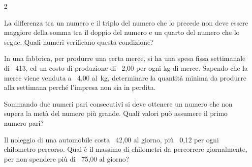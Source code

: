 \begin{htmulticols}{2}

% 
% 

\begin{esercizio}[]
\label{ese:dis_}
La differenza tra un numero e il triplo del numero che lo precede non deve 
essere maggiore della somma tra il doppio del numero e un quarto del numero 
che lo segue. Quali numeri verificano questa condizione?
\end{esercizio}

\begin{esercizio}
\label{ese:dis_}
In una fabbrica, per produrre una certa merce, si ha
una spesa fissa settimanale di \officialeuro\ 413, ed un costo di 
produzione di \officialeuro\ 2,00 per ogni
kg di merce. 
Sapendo che la merce viene venduta a \officialeuro\ 4,00 al~kg, 
determinare la quantità minima da produrre
alla settimana perché l'impresa non sia in perdita.
\end{esercizio}

\begin{esercizio}[]
\label{ese:dis_}
Sommando due numeri pari consecutivi si deve ottenere un numero che
non supera la metà del numero più grande. Quali valori può
assumere il primo numero pari?
\end{esercizio}

\begin{esercizio}[]
\label{ese:dis_}
Il noleggio di una automobile costa \officialeuro\ 42,00 al giorno, più
\officialeuro\ 0,12 per ogni chilometro percorso. Qual è il massimo di
chilometri da percorrere giornalmente, per non spendere più di 
\officialeuro\ 75,00 al giorno?
\end{esercizio}


\end{htmulticols}
